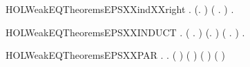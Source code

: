 \newcommand{\HOLWeakEQTheoremsEPSXXind}{\UseVerbatim{HOLWeakEQTheoremsEPSXXind}}
\begin{SaveVerbatim}{HOLWeakEQTheoremsEPSXXindXXright}
\HOLTokenTurnstile{} \HOLSymConst{\HOLTokenForall{}}.
       (\HOLSymConst{\HOLTokenForall{}}.   ) \HOLSymConst{\HOLTokenConj{}} (\HOLSymConst{\HOLTokenForall{}}  .    \HOLSymConst{\HOLTokenConj{}}  \HOLTokenTransBegin\HOLConst{\ensuremath{\tau}}\HOLTokenTransEnd {} \HOLSymConst{\HOLTokenImp{}}   ) \HOLSymConst{\HOLTokenImp{}}
       \HOLSymConst{\HOLTokenForall{}} .    \HOLSymConst{\HOLTokenImp{}}   
\end{SaveVerbatim}
\newcommand{\HOLWeakEQTheoremsEPSXXindXXright}{\UseVerbatim{HOLWeakEQTheoremsEPSXXindXXright}}
\begin{SaveVerbatim}{HOLWeakEQTheoremsEPSXXINDUCT}
\HOLTokenTurnstile{} \HOLSymConst{\HOLTokenForall{}}.
       (\HOLSymConst{\HOLTokenForall{}} .  \HOLTokenTransBegin\HOLConst{\ensuremath{\tau}}\HOLTokenTransEnd {} \HOLSymConst{\HOLTokenImp{}}   ) \HOLSymConst{\HOLTokenConj{}} (\HOLSymConst{\HOLTokenForall{}}.   ) \HOLSymConst{\HOLTokenConj{}}
       (\HOLSymConst{\HOLTokenForall{}}  .    \HOLSymConst{\HOLTokenConj{}}    \HOLSymConst{\HOLTokenImp{}}   ) \HOLSymConst{\HOLTokenImp{}}
       \HOLSymConst{\HOLTokenForall{}} .    \HOLSymConst{\HOLTokenImp{}}   
\end{SaveVerbatim}
\newcommand{\HOLWeakEQTheoremsEPSXXINDUCT}{\UseVerbatim{HOLWeakEQTheoremsEPSXXINDUCT}}
\begin{SaveVerbatim}{HOLWeakEQTheoremsEPSXXPAR}
\HOLTokenTurnstile{} \HOLSymConst{\HOLTokenForall{}} .
          \HOLSymConst{\HOLTokenImp{}}
       \HOLSymConst{\HOLTokenForall{}}.  ( \HOLSymConst{\ensuremath{\parallel}} ) ( \HOLSymConst{\ensuremath{\parallel}} ) \HOLSymConst{\HOLTokenConj{}}  ( \HOLSymConst{\ensuremath{\parallel}} ) ( \HOLSymConst{\ensuremath{\parallel}} )
\end{SaveVerbatim}
